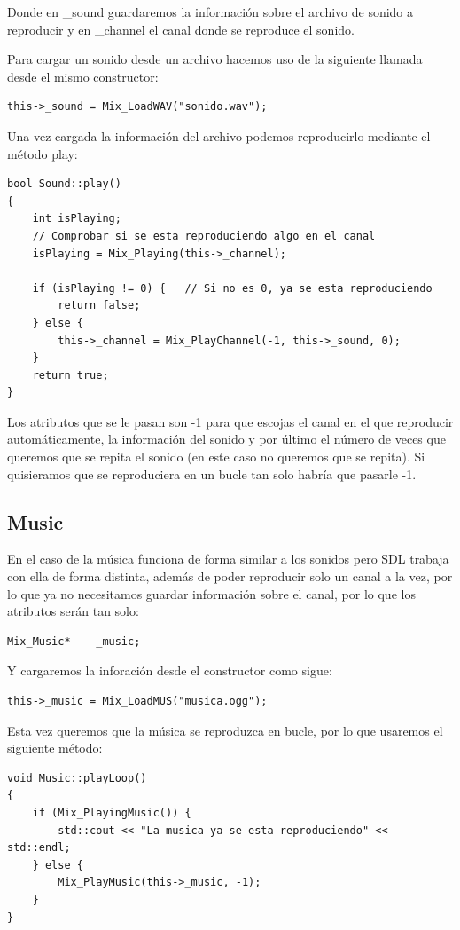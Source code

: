 \documentclass[parskip=half*]{scrartcl}
\begin{document}
		Donde en \_sound guardaremos la informaci\'on sobre el archivo de sonido a reproducir y en \_channel el canal donde se reproduce el sonido.

		Para cargar un sonido desde un archivo hacemos uso de la siguiente llamada desde el mismo constructor:
		\begin{verbatim}
this->_sound = Mix_LoadWAV("sonido.wav");
		\end{verbatim}

		Una vez cargada la informaci\'on del archivo podemos reproducirlo mediante el m\'etodo play:
		\begin{verbatim}
bool Sound::play()
{
    int isPlaying;
    // Comprobar si se esta reproduciendo algo en el canal
    isPlaying = Mix_Playing(this->_channel);
    
    if (isPlaying != 0) {	// Si no es 0, ya se esta reproduciendo
        return false;
    } else {
        this->_channel = Mix_PlayChannel(-1, this->_sound, 0);
    }
    return true;
}
		\end{verbatim}

		Los atributos que se le pasan son -1 para que escojas el canal en el que reproducir autom\'aticamente, la informaci\'on del sonido y por \'ultimo el n\'umero de veces que queremos que se repita el sonido (en este caso no queremos que se repita). Si quisieramos que se reproduciera en un bucle tan solo habr\'ia que pasarle -1.
	\subsection{Music}
		En el caso de la m\'usica funciona de forma similar a los sonidos pero SDL trabaja con ella de forma distinta, adem\'as de poder reproducir solo un canal a la vez, por lo que ya no necesitamos guardar informaci\'on sobre el canal, por lo que los atributos ser\'an tan solo:
		\begin{verbatim}
Mix_Music*    _music;
		\end{verbatim}

		Y cargaremos la inforaci\'on desde el constructor como sigue:
		\begin{verbatim}
this->_music = Mix_LoadMUS("musica.ogg");
		\end{verbatim}

		Esta vez queremos que la m\'usica se reproduzca en bucle, por lo que usaremos el siguiente m\'etodo:
		\begin{verbatim}
void Music::playLoop()
{
    if (Mix_PlayingMusic()) {
        std::cout << "La musica ya se esta reproduciendo" << std::endl;
    } else {
        Mix_PlayMusic(this->_music, -1);
    }
}
		\end{verbatim}
\end{document}
